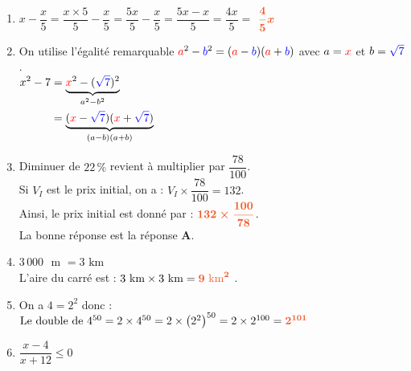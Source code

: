 \documentclass[a4paper,11pt]{article}
\begin{document}
{\begin{seanceD}{}
\begin{enumerate}
\end{enumerate}


\end{seanceD}
}{}

\newpage \begin{seance}{} %

\begin{enumerate}
\item $x-\dfrac{x}{5}=\dfrac{x\times 5}{5}-\dfrac{x}{5}=\dfrac{5x}{5}-\dfrac{x}{5}=\dfrac{5x-x}{5}=\dfrac{4x}{5}=$ ${\color[HTML]{f15929}\boldsymbol{\dfrac{4}{5}x}}$

\item On utilise l'égalité remarquable ${\color{red} a}^2-{\color{blue} b}^2=({\color{red} a}-{\color{blue} b})({\color{red} a}+{\color{blue} b})$ avec $a={\color{red} x}$  et $b={\color{blue} \sqrt{7}}$.\\$\begin{aligned}
         x^2-7&=\underbrace{{\color{red} x}^2-({\color{blue} \sqrt{7}})^2}_{a^2-b^2}\\
         &=\underbrace{({\color{red} x}-{\color{blue} \sqrt{7}})({\color{red} x}+{\color{blue} \sqrt{7}})}_{(a-b)(a+b)}
         \end{aligned}$ 

\item  Diminuer de $22\,\%$ revient à multiplier par $\dfrac{78}{100}$.\\
Si $V_I$ est le prix initial, on a : $V_I \times \dfrac{78}{100}=132$.\\
Ainsi, le prix initial est donné par : ${\color[HTML]{f15929}\boldsymbol{132 \times \dfrac{100}{78}}}$.\\La bonne réponse est la réponse {\bfseries \color[HTML]{f15929}A}.

\item $3\,000$ $\text{ m}$ $= 3$ $\text{km}$\\
L'aire du carré est : $3 \text{ km}\times 3 \text{ km} = {\color[HTML]{f15929}\boldsymbol{9\text{ km}^2}}$ .

\item  On a $4=2^{2}$ donc :\\
    $
    \text{Le double de  } 4^{50}  = 2 \times 4^{50} 
     = 2\times  \left(2^{2}\right)^{50} 
    =2\times  2^{100} 
    ={\color[HTML]{f15929}\boldsymbol{2^{101}}} 
$

\item $\dfrac{x-4}{x+12} \leqslant 0$\\
\medskip


\end{enumerate}
\end{seance}
\end{document}
